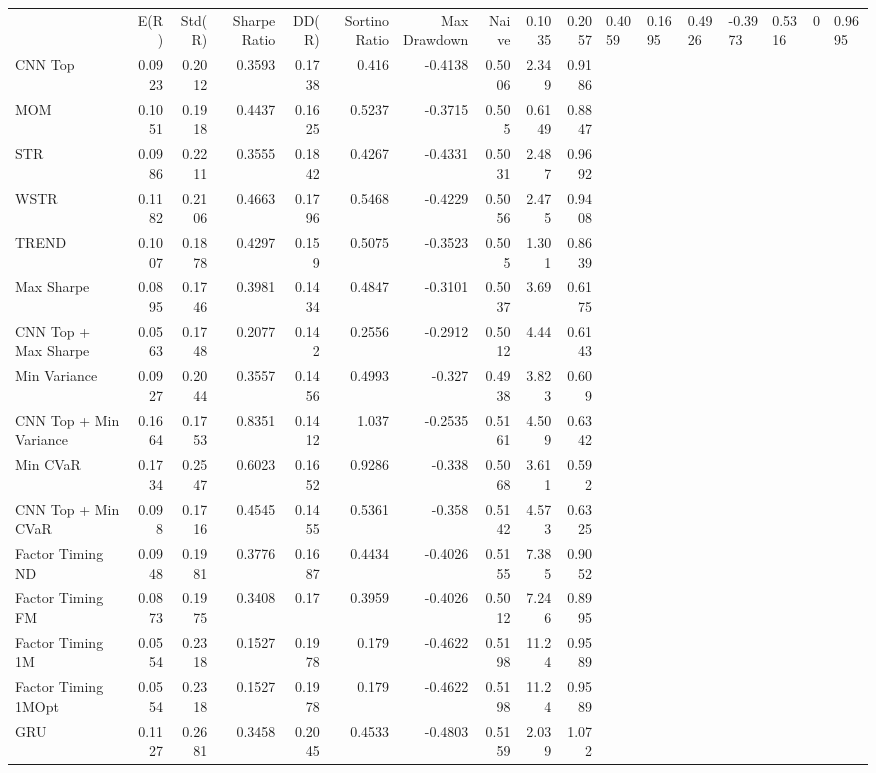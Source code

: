 \begin{tabular}{lrrrrrrrrr}
\toprule
 & E(R) & Std(R) & Sharpe Ratio & DD(R) & Sortino Ratio & Max Drawdown & %
\midrule
Naive & 0.1035 & 0.2057 & 0.4059 & 0.1695 & 0.4926 & -0.3973 & 0.5316 & 0 & 0.9695 \\
CNN Top & 0.0923 & 0.2012 & 0.3593 & 0.1738 & 0.416 & -0.4138 & 0.5006 & 2.349 & 0.9186 \\
MOM & 0.1051 & 0.1918 & 0.4437 & 0.1625 & 0.5237 & -0.3715 & 0.505 & 0.6149 & 0.8847 \\
STR & 0.0986 & 0.2211 & 0.3555 & 0.1842 & 0.4267 & -0.4331 & 0.5031 & 2.487 & 0.9692 \\
WSTR & 0.1182 & 0.2106 & 0.4663 & 0.1796 & 0.5468 & -0.4229 & 0.5056 & 2.475 & 0.9408 \\
TREND & 0.1007 & 0.1878 & 0.4297 & 0.159 & 0.5075 & -0.3523 & 0.505 & 1.301 & 0.8639 \\
Max Sharpe & 0.0895 & 0.1746 & 0.3981 & 0.1434 & 0.4847 & -0.3101 & 0.5037 & 3.69 & 0.6175 \\
CNN Top + Max Sharpe & 0.0563 & 0.1748 & 0.2077 & 0.142 & 0.2556 & -0.2912 & 0.5012 & 4.44 & 0.6143 \\
Min Variance & 0.0927 & 0.2044 & 0.3557 & 0.1456 & 0.4993 & -0.327 & 0.4938 & 3.823 & 0.609 \\
CNN Top + Min Variance & 0.1664 & 0.1753 & 0.8351 & 0.1412 & 1.037 & -0.2535 & 0.5161 & 4.509 & 0.6342 \\
Min CVaR & 0.1734 & 0.2547 & 0.6023 & 0.1652 & 0.9286 & -0.338 & 0.5068 & 3.611 & 0.592 \\
CNN Top + Min CVaR & 0.098 & 0.1716 & 0.4545 & 0.1455 & 0.5361 & -0.358 & 0.5142 & 4.573 & 0.6325 \\
Factor Timing ND & 0.0948 & 0.1981 & 0.3776 & 0.1687 & 0.4434 & -0.4026 & 0.5155 & 7.385 & 0.9052 \\
Factor Timing FM & 0.0873 & 0.1975 & 0.3408 & 0.17 & 0.3959 & -0.4026 & 0.5012 & 7.246 & 0.8995 \\
Factor Timing 1M & 0.0554 & 0.2318 & 0.1527 & 0.1978 & 0.179 & -0.4622 & 0.5198 & 11.24 & 0.9589 \\
Factor Timing 1MOpt & 0.0554 & 0.2318 & 0.1527 & 0.1978 & 0.179 & -0.4622 & 0.5198 & 11.24 & 0.9589 \\
GRU & 0.1127 & 0.2681 & 0.3458 & 0.2045 & 0.4533 & -0.4803 & 0.5159 & 2.039 & 1.072 \\
\bottomrule
\end{tabular}
